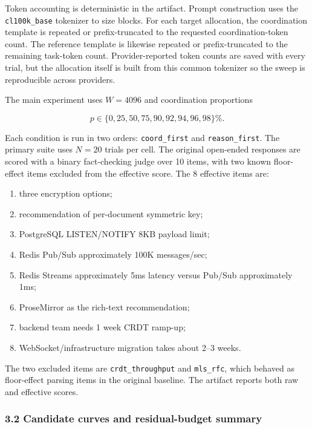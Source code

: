 \documentclass[
  runningheads]{llncs}
\providecommand{\tightlist}{%
  \setlength{\itemsep}{0pt}\setlength{\parskip}{0pt}}
\begin{document}
Token accounting is deterministic in the artifact. Prompt construction
uses the \texttt{cl100k\_base} tokenizer to size blocks. For each target
allocation, the coordination template is repeated or prefix-truncated to
the requested coordination-token count. The reference template is
likewise repeated or prefix-truncated to the remaining task-token count.
Provider-reported token counts are saved with every trial, but the
allocation itself is built from this common tokenizer so the sweep is
reproducible across providers.

The main experiment uses \(W=4096\) and coordination proportions

\[p \in \{0,25,50,75,90,92,94,96,98\}\%.\]

Each condition is run in two orders: \texttt{coord\_first} and
\texttt{reason\_first}. The primary suite uses \(N=20\) trials per cell.
The original open-ended responses are scored with a binary fact-checking
judge over 10 items, with two known floor-effect items excluded from the
effective score. The 8 effective items are:

\begin{enumerate}
\def\labelenumi{\arabic{enumi}.}
\tightlist
\item
  three encryption options;
\item
  recommendation of per-document symmetric key;
\item
  PostgreSQL LISTEN/NOTIFY 8KB payload limit;
\item
  Redis Pub/Sub approximately 100K messages/sec;
\item
  Redis Streams approximately 5ms latency versus Pub/Sub approximately
  1ms;
\item
  ProseMirror as the rich-text recommendation;
\item
  backend team needs 1 week CRDT ramp-up;
\item
  WebSocket/infrastructure migration takes about 2--3 weeks.
\end{enumerate}

The two excluded items are \texttt{crdt\_throughput} and
\texttt{mls\_rfc}, which behaved as floor-effect parsing items in the
original baseline. The artifact reports both raw and effective scores.

\subsubsection{3.2 Candidate curves and residual-budget
summary}\label{candidate-curves-and-residual-budget-summary}
\end{document}
